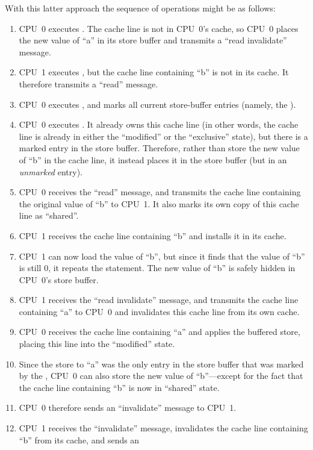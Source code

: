 With this latter approach the sequence of operations might be as follows:
\begin{enumerate}
\item	CPU~0 executes .  The cache line is not in
	CPU~0's cache, so CPU~0 places the new value of ``a'' in its
	store buffer and transmits a ``read invalidate'' message.
\item	CPU~1 executes , but the cache line
	containing ``b'' is not in its cache.
	It therefore transmits a ``read'' message.
\item	CPU~0 executes , and marks all current store-buffer
	entries (namely, the ).
\item	CPU~0 executes .
	It already owns this cache line (in other words, the cache line
	is already in either the ``modified'' or the ``exclusive'' state),
	but there is a marked entry in the store buffer.
	Therefore, rather than store the new value of ``b'' in the
	cache line, it instead places it in the store buffer (but
	in an \emph{unmarked} entry).
\item	CPU~0 receives the ``read'' message, and transmits the
	cache line containing the original value of ``b''
	to CPU~1.
	It also marks its own copy of this cache line as ``shared''.
\item	CPU~1 receives the cache line containing ``b'' and installs
	it in its cache.
\item	CPU~1 can now load the value of ``b'',
	but since it finds that the value of ``b'' is still 0, it repeats
	the  statement.
	The new value of ``b'' is safely hidden in CPU~0's store buffer.
\item	CPU~1 receives the ``read invalidate'' message, and
	transmits the cache line containing ``a'' to CPU~0 and
	invalidates this cache line from its own cache.
\item	CPU~0 receives the cache line containing ``a'' and applies
	the buffered store, placing this line into the ``modified''
	state.
\item	Since the store to ``a'' was the only
	entry in the store buffer that was marked by the ,
	CPU~0 can also store the new value of ``b''---except for the
	fact that the cache line containing ``b'' is now in ``shared''
	state.
\item	CPU~0 therefore sends an ``invalidate'' message to CPU~1.
\item	CPU~1 receives the ``invalidate'' message, invalidates the
	cache line containing ``b'' from its cache, and sends an

\end{enumerate}
